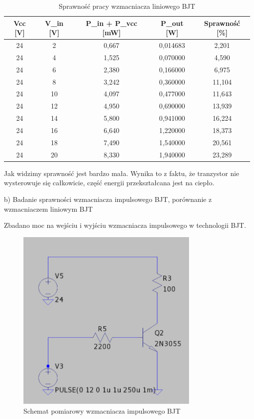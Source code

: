 \documentclass[11pt]{article}
\begin{document}
\begin{table}[H]
\centering
\begin{tabular}{|c|c|c|c|c|}
\hline
\textbf{Vcc [V]} & \textbf{V\_in [V]} & \textbf{P\_in + P\_vcc [mW]} & \textbf{P\_out [W]} & \textbf{Sprawność [\%]} \\
\hline
24 & 2  & 0{,}667  & 0{,}014683 & 2{,}201 \\
\hline
24 & 4  & 1{,}525  & 0{,}070000 & 4{,}590 \\
\hline
24 & 6  & 2{,}380  & 0{,}166000 & 6{,}975 \\
\hline
24 & 8  & 3{,}242  & 0{,}360000 & 11{,}104 \\
\hline
24 & 10 & 4{,}097  & 0{,}477000 & 11{,}643 \\
\hline
24 & 12 & 4{,}950  & 0{,}690000 & 13{,}939 \\
\hline
24 & 14 & 5{,}800  & 0{,}941000 & 16{,}224 \\
\hline
24 & 16 & 6{,}640  & 1{,}220000 & 18{,}373 \\
\hline
24 & 18 & 7{,}490  & 1{,}540000 & 20{,}561 \\
\hline
24 & 20 & 8{,}330  & 1{,}940000 & 23{,}289 \\
\hline
\end{tabular}
\caption{Sprawność pracy wzmacniacza liniowego BJT}
\end{table}

Jak widzimy sprawność jest bardzo mała. Wynika to z faktu, że tranzystor nie wysterowuje się całkowicie,
część energii przekształcana jest na ciepło.

b) Badanie sprawności wzmacniacza impulsowego BJT, porównanie z wzmacniaczem liniowym BJT

Zbadano moc na wejściu i wyjściu wzmacniacza impulsowego w technologii BJT.\\

\begin{figure}[H]
\centering
\includegraphics[width=0.8\textwidth]{aun1_impulsowy_bjt.png}
\caption{Schemat pomiarowy wzmacniacza impulsowego BJT}
\end{figure}
\end{document}
